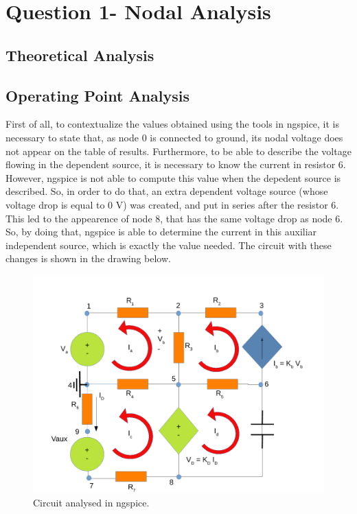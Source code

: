 \section{Question 1- Nodal Analysis}


\subsection{Theoretical Analysis}




\subsection{Operating Point Analysis}
First of all, to contextualize the values obtained using the tools in ngspice, it is necessary to state that, as node 0 is connected to ground, its nodal voltage does not appear on the table of results. Furthermore, to be able to describe the voltage flowing in the dependent source, it is necessary to know the current in resistor 6. However, ngspice is not able to compute this value when the depedent source is described. So, in order to do that, an extra dependent voltage source (whose voltage drop is equal to 0 V) was created, and put in series after the resistor 6. This led to the appearence of node 8, that has the same voltage drop as node 6. So, by doing that, ngspice is able to determine the current in this auxiliar independent source, which is exactly the value needed.
 The circuit with these changes is shown in the drawing below.

\begin{figure}[ht] \centering
\includegraphics[width=1.0\linewidth]{sim1draw.pdf}
\caption{Circuit analysed in ngspice.}
\label{simdraw}
\end{figure}

